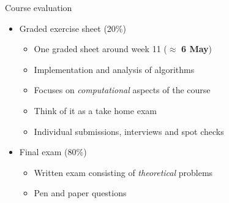 \begin{frame}{Course evaluation}
    \begin{itemize}
        \item Graded exercise sheet \alert{(20\%)}
            \begin{itemize}
                \item \alert{One graded sheet}
                    around week 11 ($\approx$ \textbf{6 May})
                \item \alert{Implementation and analysis of algorithms}
                \item Focuses on \textit{computational} aspects of the course
                \item Think of it as a \alert{take home exam}
                \item Individual submissions, interviews and spot checks
            \end{itemize}
        \vspace{2em}
        \item Final exam \alert{(80\%)}
            \begin{itemize}
                \item \alert{Written exam}
                    consisting of \textit{theoretical} problems
                \item Pen and paper questions
            \end{itemize}
    \end{itemize}
\end{frame}


